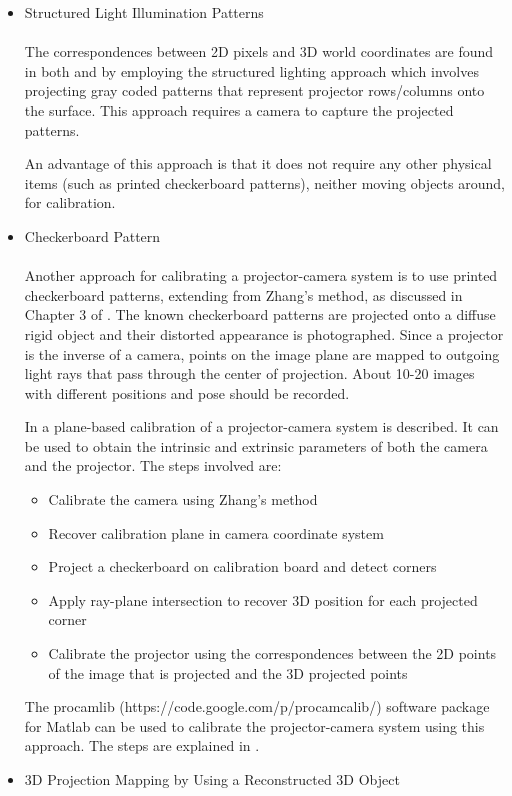 \documentclass[]{article}
\begin{document}
\begin{itemize}
\item Structured Light Illumination Patterns
\\
\\The correspondences between 2D pixels and 3D world coordinates are found in both \cite{radhwan11} and \cite{yamazaki11} by employing the structured lighting approach which involves projecting gray coded patterns that represent projector rows/columns onto the surface. This approach requires a camera to capture the projected patterns.

An advantage of this approach is that it does not require any other physical items (such as printed checkerboard patterns), neither moving objects around, for calibration.\\
\item Checkerboard Pattern\\
\\Another approach for calibrating a projector-camera system is to use printed checkerboard patterns, extending from Zhang's method, as discussed in Chapter 3 of \cite{lanman09}. The known checkerboard patterns are projected onto a diffuse rigid object and their distorted appearance is photographed. Since a projector is the inverse of a camera, points on the image plane are mapped to outgoing light rays that pass through the center of projection. About 10-20 images with different positions and pose should be recorded.

In \cite{falcao08} a plane-based calibration of a projector-camera system is described. It can be used to obtain the intrinsic and extrinsic parameters of both the camera and the projector. The steps involved are:
\begin{itemize}
\item Calibrate the camera using Zhang's method
\item Recover calibration plane in camera coordinate system
\item Project a checkerboard on calibration board and detect corners
\item Apply ray-plane intersection to recover 3D position for each projected corner
\item Calibrate the projector using the correspondences between the 2D points of the image that is projected and the 3D projected points
\end{itemize}


The procamlib (https://code.google.com/p/procamcalib/) software package for Matlab can be used to calibrate the projector-camera system using this approach. The steps are explained in \cite{falcao08}.\\
\item 3D Projection Mapping by Using a Reconstructed 3D Object\\


\end{itemize}
\end{document}
